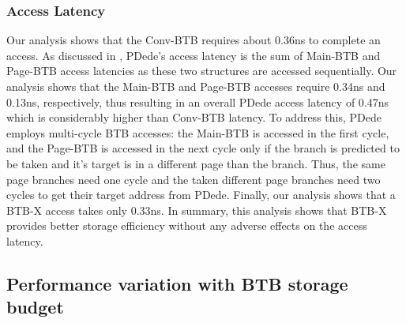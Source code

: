 \subsubsection{Access Latency}
Our analysis shows that the Conv-BTB requires about 0.36ns to complete an access. As discussed in , PDede's access latency is the sum of Main-BTB and Page-BTB access latencies as these two structures are accessed sequentially. Our analysis shows that the Main-BTB and Page-BTB accesses require 0.34ns and 0.13ns, respectively, thus resulting in an overall PDede access latency of 0.47ns which is considerably higher than Conv-BTB latency. To address this, PDede employs multi-cycle BTB accesses: the Main-BTB is accessed in the first cycle, and the Page-BTB is accessed in the next cycle only if the branch is predicted to be taken and it's target is in a different page than the branch. Thus, the same page branches need one cycle and the taken different page branches need two cycles to get their target address from PDede. Finally, our analysis shows that a BTB-X access takes only 0.33ns. In summary, this analysis shows that BTB-X provides better storage efficiency without any adverse effects on the access latency.


\subsection{Performance variation with BTB storage budget}


